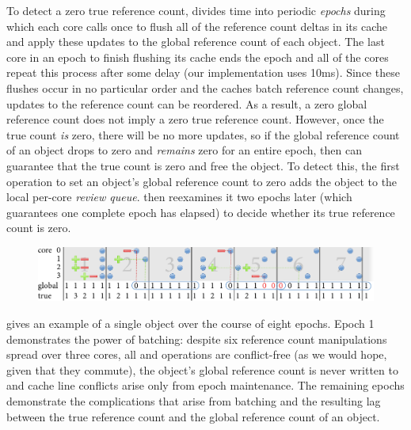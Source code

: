 To detect a zero true reference count,  divides time into
periodic \emph{epochs} during which each core calls  once
to flush all of the
reference count deltas in its cache and apply these updates to the
global reference count of each object.  The last core in an epoch to
finish flushing its cache ends the epoch and all of the cores repeat
this process after some delay (our implementation uses 10ms).  Since
these flushes occur in no particular order and the caches batch
reference count changes, updates to the reference count can be
reordered.  As a result, a zero global reference count does not imply
a zero true reference count.  However, once the true count \emph{is}
zero, there will be no more updates, so if the global reference count
of an object drops to zero and \emph{remains} zero for an entire
epoch, then  can guarantee that the true count is zero
and free the object.  To detect this, the first 
operation to set an object's global reference count to zero adds the
object to the local per-core \emph{review queue}.   then
reexamines it two epochs later (which
guarantees one complete epoch has elapsed) to decide whether its true
reference count is zero.

\begin{figure}
  \centering
  \includegraphics[width=5.5in]{figures/refcache.pdf}
  \label{fig:refcache-ex}
\end{figure}

 gives an example of a single object over
the course of eight epochs.  Epoch 1 demonstrates the power of
batching: despite six reference count manipulations spread over three
cores, all  and  operations are conflict-free (as
we would hope, given that they commute), the object's global reference
count is never written to and
cache line conflicts arise only from epoch maintenance.  The
remaining epochs demonstrate the complications that arise from
batching and the resulting lag between the true reference count and
the global reference count of an object.

